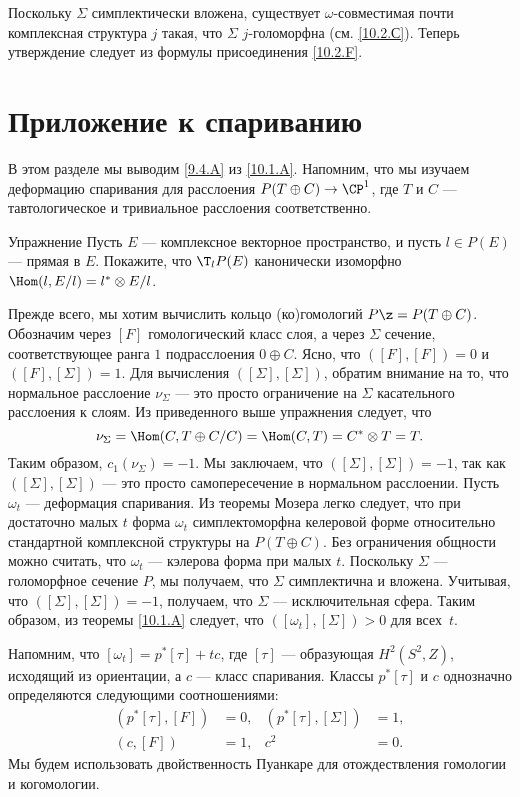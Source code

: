 Поскольку $\Sigma$ симплектически вложена, существует $\omega$-совместимая почти комплексная структура $j$ такая, что $\Sigma$ $j$-голоморфна (см. \ref{10.2.С}).
Теперь утверждение следует из формулы присоединения \ref{10.2.F}.
\qeds


\section{Приложение к спариванию}

В этом разделе мы выводим \ref{9.4.A} из \ref{10.1.A}.
Напомним, что мы изучаем деформацию спаривания для расслоения $P(T \oplus C) \to \CP^1$, где $T$ и $C$ --- тавтологическое и тривиальное расслоения соответственно.

\begin{ex*}{Упражнение}
Пусть $E$ --- комплексное векторное пространство, и пусть $l \in P(E)$ --- прямая в $E$.
Покажите, что $\T_l P(E)$ канонически изоморфно $\Hom(l, E/l) = l^\ast \otimes E/l$.
\end{ex*}

Прежде всего, мы хотим вычислить кольцо (ко)гомологий $P \z= P(T \oplus C)$.
Обозначим через $[F]$ гомологический класс слоя, а через $\Sigma$ сечение, соответствующее ранга $1$ подрасслоения $0 \oplus C$.
Ясно, что $([F], [F]) = 0$ и $([F], [\Sigma]) = 1$.
Для вычисления $([\Sigma], [\Sigma])$, обратим внимание на то, что нормальное расслоение $\nu_\Sigma$ --- это просто ограничение на $\Sigma$ касательного расслоения к слоям.
Из приведенного выше упражнения следует, что 
\[\nu_\Sigma = \Hom(C, T \oplus C/C) = \Hom(C, T) = C^\ast \otimes T = T.\]
Таким образом, $c_1 (\nu_\Sigma) = -1$.
Мы заключаем, что $([\Sigma], [\Sigma]) = -1$, так как $([\Sigma], [\Sigma])$ --- это просто самопересечение в нормальном расслоении.
Пусть $\omega_t$ --- деформация спаривания.
Из теоремы Мозера \cite{MS} легко следует, что при достаточно малых $t$ форма $\omega_t$ симплектоморфна келеровой форме относительно стандартной комплексной структуры на $P(T \oplus C)$.
Без ограничения общности можно считать, что $\omega_t$ --- кэлерова форма при малых $t$.
Поскольку $\Sigma$ --- голоморфное сечение $P$, мы получаем, что $\Sigma$ симплектична и вложена.
Учитывая, что $([\Sigma], [\Sigma]) = -1$, получаем, что $\Sigma$ --- исключительная сфера.
Таким образом, из теоремы \ref{10.1.A} следует, что $([\omega_t], [\Sigma]) > 0$ для всех~$t$.

Напомним, что $[\omega_t] = p^\ast [\tau] + tc$, где $[\tau]$ --- образующая $H^2 (S^2, Z)$, исходящий из ориентации, а $c$ --- класс спаривания.
Классы $p^\ast [\tau]$ и $c$ однозначно определяются следующими соотношениями: 
\begin{align*}
(p^\ast [\tau], [F]) &= 0,
&
(p^\ast [\tau], [\Sigma]) &= 1,
\\
(c, [F]) &= 1,
&
c^2 &= 0.
\end{align*}
Мы будем использовать двойственность Пуанкаре для отождествления гомологии и когомологии.


